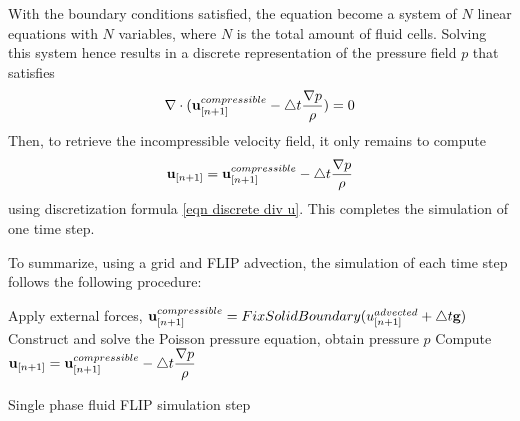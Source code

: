 With the boundary conditions satisfied, the equation become a system of $N$ linear equations with $N$ variables, where $N$ is the total amount of fluid cells. Solving this system hence results in a discrete representation of the pressure field $p$ that satisfies 
$$
\nabla \cdot
 ( \textbf{u}_{[n+1]}^{compressible} - \triangle t \frac{\nabla p}{\rho} ) = 0
$$
Then, to retrieve the incompressible velocity field, it only remains to compute
$$ \textbf{u}_{[n+1]} = \textbf{u}_{[n+1]}^{compressible} - \triangle t \frac{\nabla p}{\rho}$$
using discretization formula \ref{eqn discrete div u}. This completes the simulation of one time step.

\gapM

To summarize, using a grid and FLIP advection, the simulation of each time step follows the following procedure:

\begin{algorithm}[H]
    \label{algo singlephase flip}

    \SetAlgoLined
    Apply external forces, $\textbf{u}_{[n+1]}^{compressible} =  FixSolidBoundary(u_{[n+1]}^{advected} + \triangle t \textbf{g})$\;
    Construct and solve the Poisson pressure equation, obtain pressure $p$\;
    Compute $\textbf{u}_{[n+1]} = \textbf{u}_{[n+1]}^{compressible} - \triangle t \dfrac{\nabla p}{\rho}$

    \caption{Single phase fluid FLIP simulation step}
\end{algorithm}


